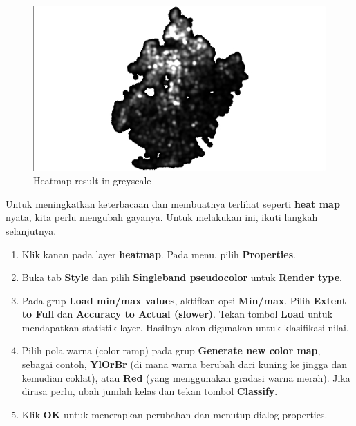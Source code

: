 \documentclass[]{book}
\begin{document}
\begin{figure}

{\centering \includegraphics[width=0.8\linewidth]{images/04/fig76} 

}

\caption{Heatmap result in greyscale}\label{fig:fig1476}
\end{figure}

Untuk meningkatkan keterbacaan dan membuatnya terlihat seperti \textbf{heat map} nyata, kita perlu mengubah gayanya. Untuk melakukan ini, ikuti langkah selanjutnya.

\begin{enumerate}
\def\labelenumi{\arabic{enumi}.}
\item
  Klik kanan pada layer \textbf{heatmap}. Pada menu, pilih \textbf{Properties}.
\item
  Buka tab \textbf{Style} dan pilih \textbf{Singleband pseudocolor} untuk \textbf{Render type}.
\item
  Pada grup \textbf{Load min/max values}, aktifkan opsi \textbf{Min/max}. Pilih \textbf{Extent to Full} dan \textbf{Accuracy to Actual (slower)}. Tekan tombol \textbf{Load} untuk mendapatkan statistik layer. Hasilnya akan digunakan untuk klasifikasi nilai.
\item
  Pilih pola warna (color ramp) pada grup \textbf{Generate new color map}, sebagai contoh, \textbf{YlOrBr} (di mana warna berubah dari kuning ke jingga dan kemudian coklat), atau \textbf{Red} (yang menggunakan gradasi warna merah). Jika dirasa perlu, ubah jumlah kelas dan tekan tombol \textbf{Classify}.
\item
  Klik \textbf{OK} untuk menerapkan perubahan dan menutup dialog properties.
\end{enumerate}
\end{document}
